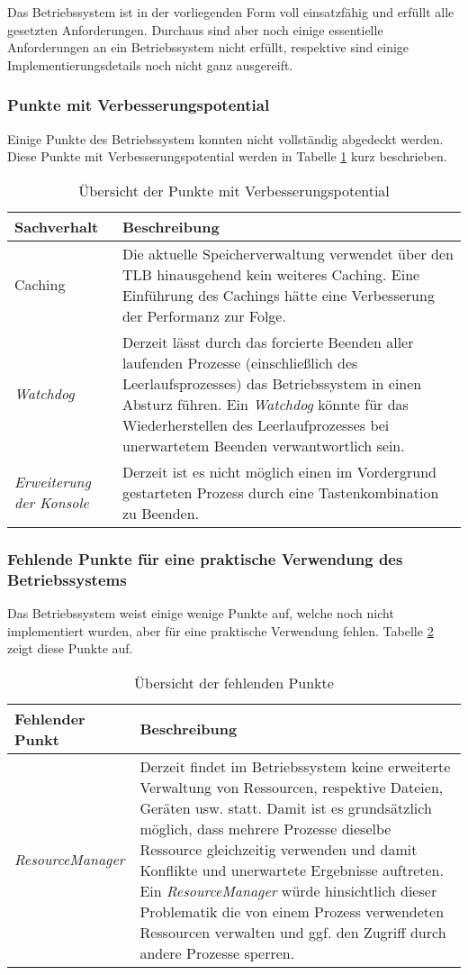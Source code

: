 Das Betriebssystem ist in der vorliegenden Form voll einsatzfähig und erfüllt alle gesetzten Anforderungen. Durchaus sind aber noch einige essentielle Anforderungen an ein Betriebssystem nicht erfüllt, respektive sind einige Implementierungsdetails noch nicht ganz ausgereift.

\subsubsection{Punkte mit Verbesserungspotential}
Einige Punkte des Betriebssystem konnten nicht vollständig abgedeckt werden. Diese Punkte mit Verbesserungspotential werden in Tabelle \ref{table:points-to-improve} kurz beschrieben.

\begin{table}[H]
\begin{tabular}{p{5cm} | p{9cm}}
  \textbf{Sachverhalt} & \textbf{Beschreibung}
  \\ \hline
  Caching & Die aktuelle Speicherverwaltung verwendet über den \ac{TLB} hinausgehend kein weiteres Caching. Eine Einführung des Cachings hätte eine Verbesserung der Performanz zur Folge.
  \\
  \textit{Watchdog} & Derzeit lässt durch das forcierte Beenden aller laufenden Prozesse (einschließlich des Leerlaufsprozesses) das Betriebssystem in einen Absturz führen. Ein \textit{Watchdog} könnte für das Wiederherstellen des Leerlaufprozesses bei unerwartetem Beenden verwantwortlich sein.
  \\
  \textit{Erweiterung der Konsole} & Derzeit ist es nicht möglich einen im Vordergrund gestarteten Prozess durch eine Tastenkombination zu Beenden.
  \\
 \end{tabular}
 \caption{Übersicht der Punkte mit Verbesserungspotential}
 \label{table:points-to-improve}
\end{table}

\subsubsection{Fehlende Punkte für eine praktische Verwendung des Betriebssystems}
Das Betriebssystem weist einige wenige Punkte auf, welche noch nicht implementiert wurden, aber für eine praktische Verwendung fehlen. Tabelle \ref{table:missing-points} zeigt diese Punkte auf.

\begin{table}[H]
\begin{tabular}{p{5cm} | p{9cm}}
  \textbf{Fehlender Punkt} & \textbf{Beschreibung}
  \\ \hline
  \textit{ResourceManager} & Derzeit findet im Betriebssystem keine erweiterte Verwaltung von Ressourcen, respektive Dateien, Geräten usw. statt. Damit ist es grundsätzlich möglich, dass mehrere Prozesse dieselbe Ressource gleichzeitig verwenden und damit Konflikte und unerwartete Ergebnisse auftreten. Ein \textit{ResourceManager} würde hinsichtlich dieser Problematik die von einem Prozess verwendeten Ressourcen verwalten und ggf. den Zugriff durch andere Prozesse sperren.
  \\
 \end{tabular}
 \caption{Übersicht der fehlenden Punkte}
 \label{table:missing-points}
\end{table}
